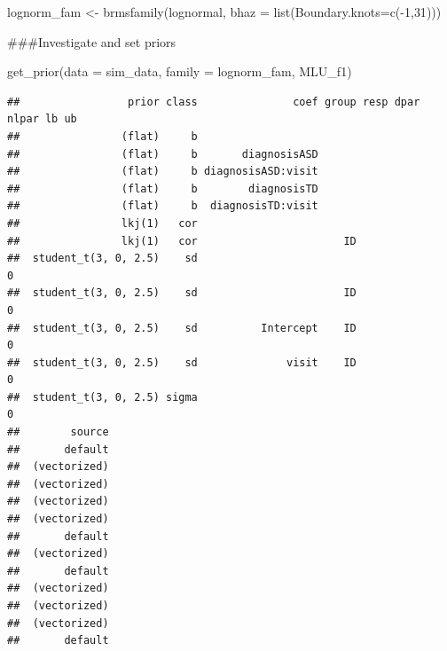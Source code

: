 \documentclass[
]{article}
\newenvironment{Shaded}{\begin{snugshade}}{\end{snugshade}}
\newcommand{\AttributeTok}[1]{\textcolor[rgb]{0.77,0.63,0.00}{#1}}
\newcommand{\DecValTok}[1]{\textcolor[rgb]{0.00,0.00,0.81}{#1}}
\newcommand{\FunctionTok}[1]{\textcolor[rgb]{0.00,0.00,0.00}{#1}}
\newcommand{\NormalTok}[1]{#1}
\newcommand{\OtherTok}[1]{\textcolor[rgb]{0.56,0.35,0.01}{#1}}
\newcommand{\SpecialCharTok}[1]{\textcolor[rgb]{0.00,0.00,0.00}{#1}}
\newcommand{\StringTok}[1]{\textcolor[rgb]{0.31,0.60,0.02}{#1}}
\begin{document}
\begin{Shaded}
\begin{Highlighting}[]
\NormalTok{lognorm\_fam }\OtherTok{\textless{}{-}} \FunctionTok{brmsfamily}\NormalTok{(}\StringTok{\textquotesingle{}lognormal\textquotesingle{}}\NormalTok{, }\AttributeTok{bhaz =} \FunctionTok{list}\NormalTok{(}\AttributeTok{Boundary.knots=}\FunctionTok{c}\NormalTok{(}\SpecialCharTok{{-}}\DecValTok{1}\NormalTok{,}\DecValTok{31}\NormalTok{)))}
\end{Highlighting}
\end{Shaded}

\#\#\#Investigate and set priors

\begin{Shaded}
\begin{Highlighting}[]
\FunctionTok{get\_prior}\NormalTok{(}\AttributeTok{data =}\NormalTok{ sim\_data, }\AttributeTok{family =}\NormalTok{ lognorm\_fam, MLU\_f1)}
\end{Highlighting}
\end{Shaded}

\begin{verbatim}
##                 prior class               coef group resp dpar nlpar lb ub
##                (flat)     b                                               
##                (flat)     b       diagnosisASD                            
##                (flat)     b diagnosisASD:visit                            
##                (flat)     b        diagnosisTD                            
##                (flat)     b  diagnosisTD:visit                            
##                lkj(1)   cor                                               
##                lkj(1)   cor                       ID                      
##  student_t(3, 0, 2.5)    sd                                           0   
##  student_t(3, 0, 2.5)    sd                       ID                  0   
##  student_t(3, 0, 2.5)    sd          Intercept    ID                  0   
##  student_t(3, 0, 2.5)    sd              visit    ID                  0   
##  student_t(3, 0, 2.5) sigma                                           0   
##        source
##       default
##  (vectorized)
##  (vectorized)
##  (vectorized)
##  (vectorized)
##       default
##  (vectorized)
##       default
##  (vectorized)
##  (vectorized)
##  (vectorized)
##       default
\end{verbatim}
\end{document}

